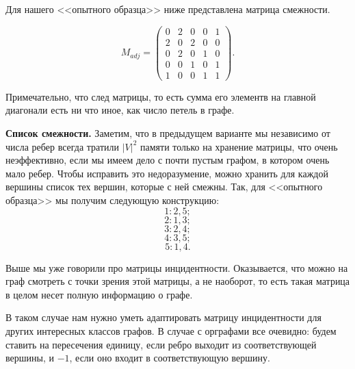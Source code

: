 	Для нашего <<опытного образца>> ниже представлена матрица смежности.

\[	
	M_{adj} =
	\begin{pmatrix} 
	0 & 2 & 0 & 0 & 1 \\
	2 & 0 & 2 & 0 & 0 \\
	0 & 2 & 0 & 1 & 0 \\
	0 & 0 & 1 & 0 & 1 \\
	1 & 0 & 0 & 1 & 1 
	\end{pmatrix}.
\]

	Примечательно, что след матрицы, то есть сумма его элементв на главной диагонали есть ни что иное, как число петель в графе.

	\textbf{Список смежности.} Заметим, что в предыдущем варианте мы независимо от числа ребер всегда тратили $|V|^2$ памяти только на хранение матрицы, что очень неэффективно, если мы имеем дело с почти пустым графом, в котором очень мало ребер. Чтобы исправить это недоразумение, можно хранить для каждой вершины список тех вершин, которые с ней смежны. Так, для <<опытного образца>> мы получим следующую конструкцию:
$$	1: 2, 5; $$
$$	2: 1, 3; $$
$$	3: 2, 4; $$
$$	4: 3, 5; $$
$$	5: 1, 4. $$


	Выше мы уже говорили про матрицы инцидентности. Оказывается, что можно на граф смотреть с точки зрения этой матрицы, а не наоборот, то есть такая матрица в целом несет полную информацию о графе. 
	
	В таком случае нам нужно уметь адаптировать матрицу инцидентности для других интересных классов графов. В случае с орграфами все очевидно: будем ставить на пересечения единицу, если ребро выходит из соответствующей вершины, и $-1$, если оно входит в соответствующую вершину.
	


